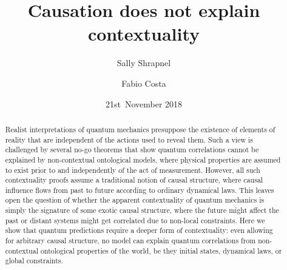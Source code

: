 \documentclass[a4paper,onecolumn,11pt,accepted=2018-05-04]{quantumarticle}
\begin{document}
 
\title{Causation does not explain contextuality}

\author{Sally Shrapnel}
\author{Fabio Costa}
\date{21st~November 2018}
\begin{abstract}

Realist interpretations of quantum mechanics presuppose the existence of elements of reality that are independent of the actions used to reveal them. Such a view is challenged by several no-go theorems that show quantum correlations cannot be explained by non-contextual ontological models, where physical properties are assumed to exist prior to and independently of the act of measurement. However, all such contextuality proofs assume a traditional notion of causal structure, where causal influence flows from past to future according to ordinary dynamical laws. This leaves open the question of whether the apparent contextuality of quantum mechanics is simply the signature of some exotic causal structure, where the future might affect the past or distant systems might get correlated due to non-local constraints. Here we show that quantum predictions require a deeper form of contextuality: even allowing for arbitrary causal structure, no model can explain quantum correlations from non-contextual ontological properties of the world, be they initial states, dynamical laws, or global constraints.

 

\end{abstract}
\maketitle
\end{document}
